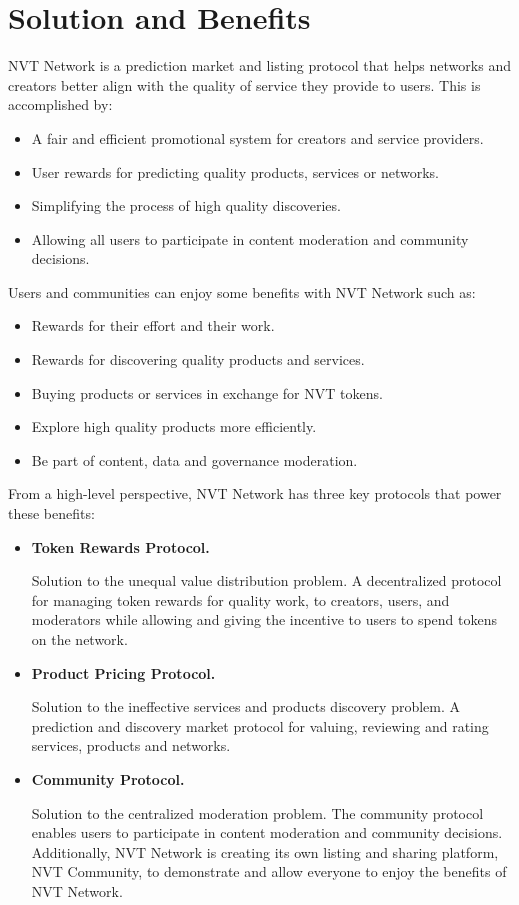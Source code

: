 \section{Solution and Benefits}
NVT Network is a prediction market and listing protocol that helps networks and creators better align with the quality of service they provide to users. This is accomplished by:

\begin{itemize}
\item A fair and efficient promotional system for creators and service providers.
\item User rewards for predicting quality products, services or networks. 
\item Simplifying the process of high quality discoveries.
\item Allowing all users to participate in content moderation and community decisions.
\end{itemize}

Users and communities can enjoy some benefits with NVT Network such as:

\begin{itemize}
\item Rewards for their effort and their work.
\item Rewards for discovering quality products and services.
\item Buying products or services in exchange for NVT tokens.
\item Explore high quality products more efficiently. 
\item Be part of content, data and governance moderation. 
\end{itemize}

From a high-level perspective, NVT Network has three key protocols that power these benefits:

\begin{itemize}
\item \textbf{Token Rewards Protocol.}

Solution to the unequal value distribution problem. A decentralized protocol for managing token rewards for quality work, to creators, users, and moderators while allowing and giving the incentive to users to spend tokens on the network.

\item \textbf{Product Pricing Protocol.}

Solution to the ineffective services and products discovery problem. A prediction and discovery market protocol for valuing, reviewing and rating services, products and networks.

\item \textbf{Community Protocol.}

Solution to the centralized moderation problem. The community protocol enables users to participate in content moderation and community decisions. Additionally, NVT Network is creating its own listing and sharing platform, NVT Community, to demonstrate and allow everyone to enjoy the benefits of NVT Network.

\end{itemize}

